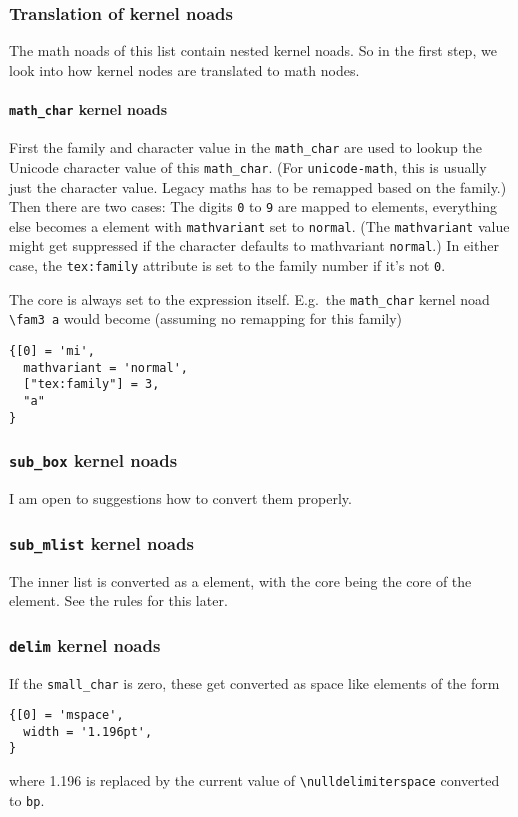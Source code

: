 \subsubsection{Translation of kernel noads}
The math noads of this list contain nested kernel noads. So in the first step, we look into how kernel nodes are translated to math nodes.

\paragraph{\texttt{math_char} kernel noads}
First the family and character value in the \texttt{math_char} are used to lookup the Unicode character value of this \texttt{math_char}.
(For \texttt{unicode-math}, this is usually just the character value. Legacy maths has to be remapped based on the family.)
Then there are two cases: The digits \texttt{0} to \texttt{9} are mapped to  elements, everything else becomes a  element with \texttt{mathvariant} set to \texttt{normal}.
(The \texttt{mathvariant} value might get suppressed if the character defaults to mathvariant \texttt{normal}.)
In either case, the \texttt{tex:family} attribute is set to the family number if it's not \texttt{0}.

The core is always set to the expression itself. E.g.\ the \texttt{math_char} kernel noad \verb+\fam3 a+ would become (assuming no remapping for this family)
\begin{verbatim}
{[0] = 'mi',
  mathvariant = 'normal',
  ["tex:family"] = 3,
  "a"
}
\end{verbatim}

\subsubsection{\texttt{sub_box} kernel noads}
I am open to suggestions how to convert them properly.

\subsubsection{\texttt{sub_mlist} kernel noads}
The inner list is converted as a  element, with the core being the core of the  element. See the rules for this later.

\subsubsection{\texttt{delim} kernel noads}
If the \texttt{small_char} is zero, these get converted as space like elements of the form
\begin{verbatim}
{[0] = 'mspace',
  width = '1.196pt',
}
\end{verbatim}
where 1.196 is replaced by the current value of \verb+\nulldelimiterspace+ converted to \texttt{bp}.

